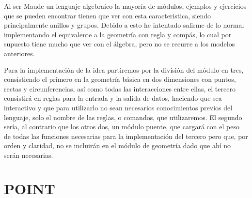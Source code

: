 
Al ser Maude un lenguaje algebraico la mayoría de módulos, ejemplos y ejercicios que se pueden encontrar tienen que ver con esta caracteristica, siendo principalmente anillos y grupos. Debido a esto he intentado salirme de lo normal implementando el equivalente a la geometría con regla y compás, lo cual por supuesto tiene mucho que ver con el álgebra, pero no se recurre a los modelos anteriores. \par

Para la implementación de la idea partiremos por la división del módulo en tres, consistiendo el primero en la geometría básica en dos dimensiones con puntos, rectas y circunferencias, así como todas las interacciones entre ellas, el tercero consistirá en reglas para la entrada y la salida de datos, haciendo que sea interactivo y que para utilizarlo no sean necesarios conocimientos previos del lenguaje, solo el nombre de las reglas, o comandos, que utilizaremos. El segundo sería, al contrario que los otros dos, un módulo puente, que cargará con el peso de todas las funciones necesarias para la implementación del tercero pero que, por orden y claridad, no se incluirán en el módulo de geometría dado que ahí no serán necesarias. \par

\section{POINT}


